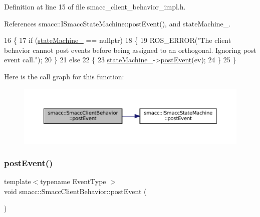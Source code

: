 Definition at line 15 of file smacc\+\_\+client\+\_\+behavior\+\_\+impl.\+h.



References smacc\+::\+I\+Smacc\+State\+Machine\+::post\+Event(), and state\+Machine\+\_\+.


\begin{DoxyCode}
16 \{
17     \textcolor{keywordflow}{if} (\hyperlink{classsmacc_1_1SmaccClientBehavior_a7950b5684d6de0a8e8959c0936ce9a19}{stateMachine\_} == \textcolor{keyword}{nullptr})
18     \{
19         ROS\_ERROR(\textcolor{stringliteral}{"The client behavior cannot post events before being assigned to an orthogonal. Ignoring
       post event call."});
20     \}
21     \textcolor{keywordflow}{else}
22     \{
23         \hyperlink{classsmacc_1_1SmaccClientBehavior_a7950b5684d6de0a8e8959c0936ce9a19}{stateMachine\_}->\hyperlink{classsmacc_1_1ISmaccStateMachine_ad80cdd7bbc9a9f3b221c625754fed1ed}{postEvent}(ev);
24     \}
25 \}
\end{DoxyCode}
Here is the call graph for this function\+:
\nopagebreak
\begin{figure}[H]
\begin{center}
\leavevmode
\includegraphics[width=350pt]{classsmacc_1_1SmaccClientBehavior_ab29b23145ea074ad69340fc0af6fbb75_cgraph}
\end{center}
\end{figure}
\mbox{\label{classsmacc_1_1SmaccClientBehavior_a3152cd2215ebc0e387a8a546de07cded}} 
\subsubsection{\texorpdfstring{post\+Event()}{postEvent()}\hspace{0.1cm}{\footnotesize\ttfamily [2/2]}}
{\footnotesize\ttfamily template$<$typename Event\+Type $>$ \\
void smacc\+::\+Smacc\+Client\+Behavior\+::post\+Event (\begin{DoxyParamCaption}{ }\end{DoxyParamCaption})}



